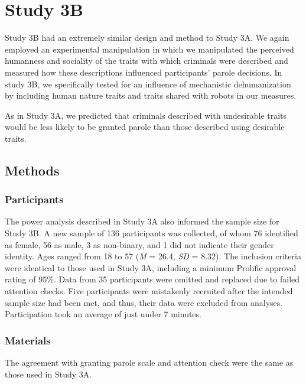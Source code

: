 \documentclass[
]{article}
\begin{document}
\hypertarget{study-3b}{%
\section{Study 3B}\label{study-3b}}

Study 3B had an extremely similar design and method to Study 3A. We again employed an experimental manipulation in which we manipulated the perceived humanness and sociality of the traits with which criminals were described and measured how these descriptions influenced participants' parole decisions. In study 3B, we specifically tested for an influence of mechanistic dehumanization by including human nature traits and traits shared with robots in our measures.

As in Study 3A, we predicted that criminals described with undesirable traits would be less likely to be granted parole than those described using desirable traits.

\hypertarget{methods-2}{%
\subsection{Methods}\label{methods-2}}

\hypertarget{participants-5}{%
\subsubsection{Participants}\label{participants-5}}

The power analysis described in Study 3A also informed the sample size for Study 3B. A new sample of 136 participants was collected, of whom 76 identified as female, 56 as male, 3 as non-binary, and 1 did not indicate their gender identity. Ages ranged from 18 to 57 (\emph{M} = 26.4, \emph{SD} = 8.32). The inclusion criteria were identical to those used in Study 3A, including a minimum Prolific approval rating of 95\%. Data from 35 participants were omitted and replaced due to failed attention checks. Five participants were mistakenly recruited after the intended sample size had been met, and thus, their data were excluded from analyses. Participation took an average of just under 7 minutes.

\hypertarget{materials-5}{%
\subsubsection{Materials}\label{materials-5}}

The agreement with granting parole scale and attention check were the same as those used in Study 3A.
\end{document}
